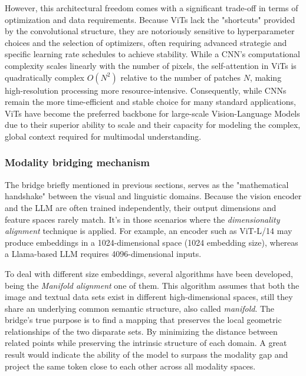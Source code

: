 However, this architectural freedom comes with a significant trade-off in terms of optimization and data requirements. Because ViTs lack the "shortcuts" provided by the convolutional structure, they are notoriously sensitive to hyperparameter choices and the selection of optimizers, often requiring advanced strategie and specific learning rate schedules to achieve stability. While a CNN's computational complexity scales linearly with the number of pixels, the self-attention in ViTs is quadratically complex $O(N^2)$ relative to the number of patches $N$, making high-resolution processing more resource-intensive. Consequently, while CNNs remain the more time-efficient and stable choice for many standard applications, ViTs have become the preferred backbone for large-scale Vision-Language Models due to their superior ability to scale and their capacity for modeling the complex, global context required for multimodal understanding.

\subsubsection{Modality bridging mechanism}
The bridge briefly mentioned in previous sections, serves as the "mathematical handshake" between the visual and linguistic domains. Because the vision encoder and the LLM are often trained independently, their output dimensions and feature spaces rarely match. It's in those scenarios where the \textit{dimensionality alignment} technique is applied. For example, an encoder such as ViT-L/14 may produce embeddings in a 1024-dimensional space (1024 embedding size), whereas a Llama-based LLM requires 4096-dimensional inputs.

To deal with different size embeddings, several algorithms have been developed, being the \textit{Manifold alignment} \cite{wiki:manifold_alignment} one of them. This algorithm assumes that both the image and textual data sets exist in different high-dimensional spaces, still they share an underlying common semantic structure, also called \textit{manifold}. The bridge's true purpose is to find a mapping that preserves the local geometric relationships of the two disparate sets. By minimizing the distance between related points while preserving the intrinsic structure of each domain. A great result would indicate the ability of the model to surpass the modality gap and project the same token close to each other across all modality spaces. 

